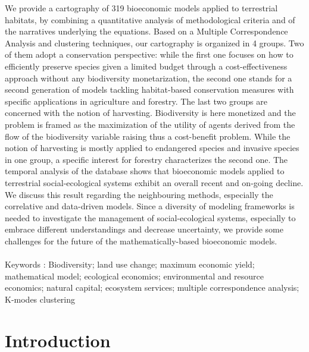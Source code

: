 \begin{center}
\begin{minipage}{0.9\textwidth}
We provide a cartography of 319 bioeconomic models applied to terrestrial habitats, by combining a quantitative analysis of methodological criteria and of the narratives underlying the equations. Based on a Multiple Correspondence Analysis and clustering techniques, our cartography is organized in 4 groups. Two of them adopt a conservation perspective: while the first one focuses on how to efficiently preserve species given a limited budget through a cost-effectiveness approach without any biodiversity monetarization, the second one stands for a second generation of models tackling habitat-based conservation measures with specific applications in agriculture and forestry. The last two groups are concerned with the notion of harvesting. Biodiversity is here monetized and the problem is framed as the maximization of the 
utility of agents derived from the flow of the biodiversity variable raising thus a cost-benefit problem. While the notion of harvesting is mostly applied to endangered species and invasive species in one group, a specific interest for forestry characterizes the second one. The temporal analysis of the database shows that bioeconomic models applied to terrestrial social-ecological systems exhibit an overall recent and on-going decline. We discuss this result regarding the neighbouring methods, especially the correlative and data-driven models. Since a diversity of modeling frameworks is needed to investigate the management of social-ecological systems, especially to embrace different understandings and decrease uncertainty, we provide some challenges for the future of the mathematically-based bioeconomic models.
\\\\
Keywords : Biodiversity; land use change; maximum economic yield; mathematical model; ecological economics; environmental and resource economics; natural capital; ecosystem services; multiple correspondence analysis; K-modes clustering
\end{minipage}
\end{center}
    \vfill
\newpage

\section{Introduction}

